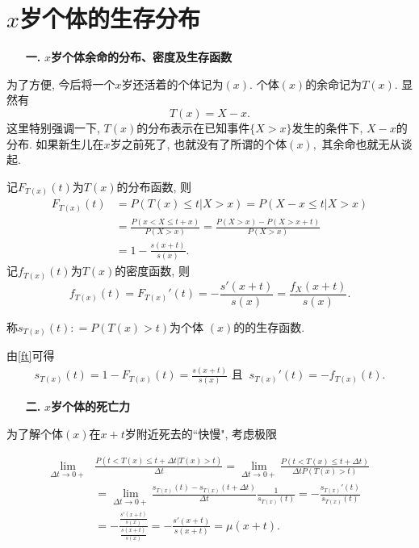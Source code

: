 \documentclass[a4paper,openany, 10pt]{ctexbook}
\newcommand{\hei}{\CJKfamily{hei}}      %
\def\no{\nonumber}
\begin{document}
\section{$x$岁个体的生存分布}

\begin{itemize}
    \item[{\bf\hei 一.}]{\bf\hei $x$岁个体余命的分布、密度及生存函数}
\end{itemize}

为了方便, 今后将一个$x$岁还活着的个体记为$(x).$ 个体$(x)$的余命记为$T(x).$ 显然有
$$T(x)=X-x.$$
这里特别强调一下,
$T(x)$的分布表示在已知事件$\{X>x\}$发生的条件下, $X-x$的分布. 如果新生儿在$x$岁之前死了, 也就没有了所谓的个体$(x),$ 其余命也就无从谈起.

记$F_{T(x)}(t)$为$T(x)$的分布函数, 则
\begin{align}\label{ft}
    F_{T(x)}(t) & = P(T(x) \leq t|X > x)
    = P(X- x \leq t | X > x)\no                        \\
                & = \frac{P(x<X \leq t + x)}{P(X > x)}
    = \frac{P(X > x) - P(X > x + t)}{P(X > x)}\no      \\
                & = 1 - \frac{s(x+t)}{s(x)}.
\end{align}
记$f_{T(x)}(t)$为$T(x)$的密度函数, 则
\begin{equation}\label{ftd}
    f_{T(x)}(t) = F_{T(x)}'(t) = -\frac{s'(x+t)}{s(x)} = \frac{f_X(x+t)}{s(x)}.
\end{equation}
\begin{definition}
    称$s_{T(x)}(t): = P(T(x)>t)$为个体 $(x)$的的生存函数.
\end{definition}

由\eqref{ft}可得
\begin{align}\label{stf}
    s_{T(x)}(t)=1-F_{T(x)}(t)=\frac{s(x+t)}{s(x)} \text{ 且 }\  s_{T(x)}'(t)=-f_{T(x)}(t).
\end{align}


\begin{itemize}
    \item[{\bf\hei 二.}]{\bf\hei $x$岁个体的死亡力}
\end{itemize}
为了解个体$(x)$在$x+t$岁附近死去的``快慢", 考虑极限

\begin{align*}
    \lim_{\Delta t\to0+} & \frac{P(t<T(x)\leqslant t+\Delta t|T(x)>t)}{\Delta t}
    =  \lim_{\Delta t\to0+}\frac{P(t<T(x)\leqslant t+\Delta t)}{\Delta tP(T(x)>t)}                                          \\
                         & = \lim_{\Delta t\to0+}\frac{s_{T(x)}(t) - s_{T(x)}(t + \Delta t)}{\Delta t}\frac{1}{s_{T(x)}(t)}
    = - \frac{s_{T(x)}'(t)}{s_{T(x)}(t)}                                                                                    \\
                         & = - \frac{\frac{s'(x+t)}{s(x)}}{\frac{s(x+t)}{s(x)}}
    =  -\frac{s'(x+t)}{s(x+t)} = \mu(x+t).
\end{align*}
\end{document}
